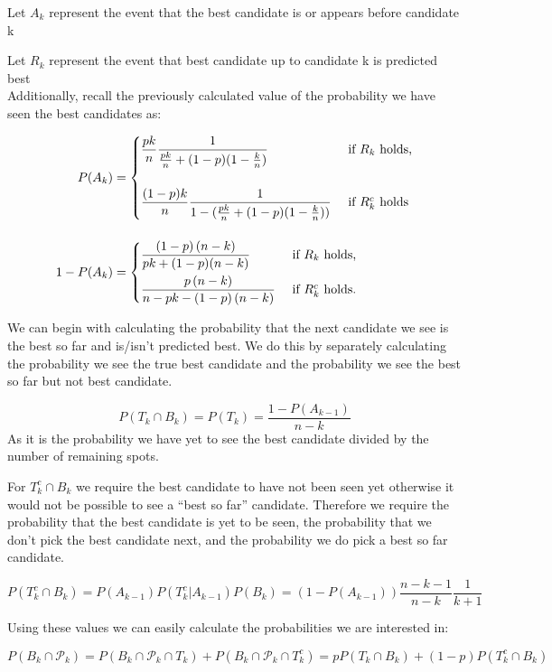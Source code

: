 \documentclass[a4paper,11pt]{article}
\begin{document}
Let $A_k$ represent the event that the best candidate is or appears before candidate k

Let $R_k$ represent the event that best candidate up to candidate k is predicted best\\

Additionally, recall the previously calculated value of the probability we have seen the best candidates as:

\begin{align*}
P(A_k) &= 
\begin{dcases*}
   \frac{pk}{n}\frac{1}{\frac{pk}{n}+(1-p)(1-\frac{k}{n})} & \text{ if $R_k$ holds,}\\[12pt]
  \frac{(1-p)k}{n}\frac{1}{1-(\frac{pk}{n}+(1-p)(1-\frac{k}{n}))} & \text{ if $R_k^c$ holds}\\
\end{dcases*} \\[12pt]
1 - P(A_k) &= 
\begin{dcases*}
   \frac{\left(1-p\right)\left(n-k\right)}{pk+(1-p)(n-k)} & \text{ if $R_k$ holds,}\\
  \frac{p\left(n-k\right)}{n-pk-\left(1-p\right)\left(n-k\right)} & \text{ if $R_k^c$ holds.}\\
\end{dcases*}
\end{align*}

We can begin with calculating the probability that the next candidate we see is the best so far and is/isn't predicted best. We do this by separately calculating the probability we see the true best candidate and the probability we see the best so far but not best candidate.

$$
P(T_k\cap B_k) = P(T_k) = \frac{1-P(A_{k-1})}{n-k}
$$
As it is the probability we have yet to see the best candidate divided by the number of remaining spots. 

For $T_k^c \cap B_k$ we require the best candidate to have not been seen yet otherwise it would not be possible to see a ``best so far'' candidate. Therefore we require the probability that the best candidate is yet to be seen, the probability that we don't pick the best candidate next, and the probability we do pick a best so far candidate. 

$$
P(T_k^c \cap B_k) = P(A_{k-1})P(T_k^c|A_{k-1})P(B_k) = (1-P(A_{k-1}))\frac{n-k-1}{n-k}\frac{1}{k+1}
$$

Using these values we can easily calculate the probabilities we are interested in:

$$
P(B_k \cap \mathcal{P}_k) = P(B_k \cap \mathcal{P}_k \cap T_k) + P(B_k \cap \mathcal{P}_k \cap T_k^c) = pP(T_k\cap B_k) + (1-p)P(T_k^c\cap B_k)
$$
\end{document}
